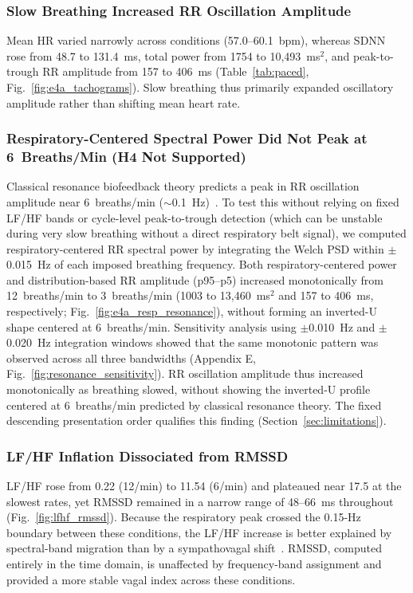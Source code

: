 \documentclass[conference]{IEEEtran}
\begin{document}
\subsubsection{Slow Breathing Increased RR Oscillation Amplitude}

Mean HR varied narrowly across conditions (57.0--60.1~bpm), whereas
SDNN rose from 48.7 to 131.4~ms, total power from 1754 to
10{,}493~ms$^{2}$, and peak-to-trough RR amplitude from 157 to
406~ms (Table~\ref{tab:paced}, Fig.~\ref{fig:e4a_tachograms}).
Slow breathing thus primarily expanded oscillatory amplitude rather
than shifting mean heart rate.

\subsubsection{Respiratory-Centered Spectral Power Did Not Peak at
6~Breaths/Min (\textbf{H4} Not Supported)}

Classical resonance biofeedback theory predicts a peak in RR
oscillation amplitude near 6~breaths/min
($\sim$0.1~Hz)~\cite{lehrer2014}.
To test this without relying on fixed LF/HF bands or cycle-level
peak-to-trough detection (which can be unstable during very slow
breathing without a direct respiratory belt signal), we computed
respiratory-centered RR spectral power by integrating the Welch PSD
within $\pm$0.015~Hz of each imposed breathing frequency.
Both respiratory-centered power and distribution-based RR amplitude
(p95--p5) increased monotonically from 12~breaths/min to
3~breaths/min (1003 to 13{,}460~ms$^{2}$ and 157 to 406~ms,
respectively; Fig.~\ref{fig:e4a_resp_resonance}), without forming
an inverted-U shape centered at 6~breaths/min.
Sensitivity analysis using $\pm$0.010~Hz and $\pm$0.020~Hz
integration windows showed that the same monotonic pattern was
observed across all three bandwidths
(Appendix E, Fig.~\ref{fig:resonance_sensitivity}).
RR oscillation amplitude thus increased monotonically as breathing
slowed, without showing the inverted-U profile centered at
6~breaths/min predicted by classical resonance theory. The
fixed descending presentation order qualifies this finding
(Section~\ref{sec:limitations}).

\subsubsection{LF/HF Inflation Dissociated from RMSSD}

LF/HF rose from 0.22 (12/min) to 11.54 (6/min) and
plateaued near 17.5 at the slowest rates, yet RMSSD remained in a
narrow range of 48--66~ms throughout (Fig.~\ref{fig:lfhf_rmssd}).
Because the respiratory peak crossed the 0.15-Hz boundary between
these conditions, the LF/HF increase is better explained by
spectral-band migration than by a sympathovagal
shift~\cite{billman2013}.
RMSSD, computed entirely in the time domain, is unaffected by
frequency-band assignment and provided a more stable vagal index
across these conditions.
\end{document}
